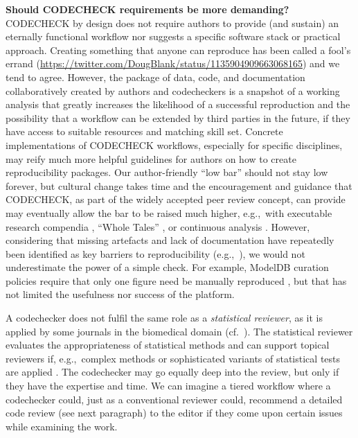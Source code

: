 \documentclass[12pt]{article}
\begin{document}
\textbf{Should CODECHECK requirements be more demanding?}
CODECHECK by design does not require authors to provide (and sustain)
an eternally functional workflow nor suggests a specific software
stack or practical approach.
Creating something
that anyone can reproduce has been called a fool's
errand (\url{https://twitter.com/DougBlank/status/1135904909663068165})
and we tend to agree.  However, the package of data, code, and
documentation collaboratively created by authors and codecheckers is a
snapshot of a working analysis that greatly increases the likelihood
of a successful reproduction and the possibility that a workflow can
be extended by third parties in the future, if they have
access to suitable resources and matching skill set.  Concrete
implementations of CODECHECK workflows, especially for specific
disciplines, may reify much more helpful guidelines for authors on how
to create reproducibility packages.  Our author-friendly ``low bar''
should not stay low forever, but cultural change takes time and the
encouragement and guidance that CODECHECK, as part of the widely
accepted peer review concept, can provide may eventually allow the bar
to be raised much higher, e.g.,~with executable research
compendia \cite{nust_opening_2017}, ``Whole Tales''
\cite{brinckman_computing_2018}, or continuous analysis
\cite{beaulieu-jones_reproducibility_2017-1}.  However, considering
that missing artefacts and lack of documentation have repeatedly been
identified as key barriers to reproducibility
(e.g.,~\cite{stagge_assessing_2019,nust_improving_2020}), we would not
underestimate the power of a simple check.  For example, ModelDB
curation policies require that only one figure need be manually reproduced
\cite{mcdougal_reproducibility_2016}, but that has not limited the
usefulness nor success of the platform.

A codechecker does not fulfil the same role as a \emph{statistical
  reviewer}, as it is applied by some journals in the biomedical
domain (cf.~\cite{petrovecki_role_2009,greenwood_how_2015}).  The
statistical reviewer evaluates the appropriateness of statistical
methods \cite{greenwood_how_2015} and can support topical reviewers
if, e.g.,~complex methods or sophisticated variants of statistical
tests are applied \cite{petrovecki_role_2009}.  The codechecker may go
equally deep into the review, but only if they have the expertise and
time. We can imagine a tiered workflow where a codechecker could, just
as a conventional reviewer could, recommend a detailed code review
(see next paragraph) to the editor if they come upon certain issues while
examining the work.
\end{document}
